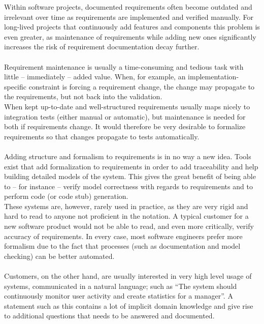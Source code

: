 
Within software projects, documented requirements often become outdated and irrelevant over time as requirements are implemented and verified manually. For long-lived projects that continuously add features and components this problem is even greater, as maintenance of requirements while adding new ones significantly increases the risk of requirement documentation decay further.\\\\
Requirement maintenance is usually a time-consuming and tedious task with little -- immediately -- added value. When, for example, an implementation-specific constraint is forcing a requirement change, the change may propagate to the requirements, but not back into the validation.\\
When kept up-to-date and well-structured requirements usually maps nicely to integration tests (either manual or automatic), but maintenance is needed for both if requirements change. It would therefore be very desirable to formalize requirements so that changes propagate to tests automatically.\\\\
Adding structure and formalism to requirements is in no way a new idea. Tools exist that add formalization to requirements in order to add traceability and help building detailed models of the system. This gives the great benefit of being able to -- for instance -- verify model correctness with regards to requirements and to perform code (or code stub) generation.\\
These systems are, however, rarely used in practice, as they are very rigid and hard to read to anyone not proficient in the notation. A typical customer for a new software product would not be able to read, and even more critically, verify accuracy of requirements. In every case, most software engineers prefer more formalism due to the fact that processes (such as documentation and model checking) can be better automated.\\\\
Customers, on the other hand, are usually interested in very high level usage of systems, communicated in a natural language; such as ``The system should continuously monitor user activity and create statistics for a manager''. A statement such as this contains a lot of implicit domain knowledge and give rise to additional questions that needs to be answered and documented.\\\\
